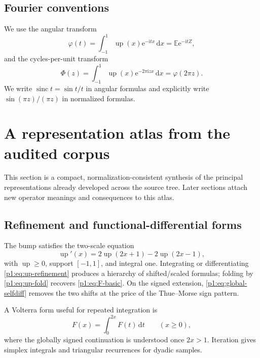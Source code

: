 \documentclass[11pt,oneside]{article}
\theoremstyle{definition}
\newcommand{\dd}{\,\mathrm d}
\newcommand{\e}{\mathrm e}
\newcommand{\ii}{\mathrm i}
\newcommand{\E}{\mathbb E}
\newcommand{\Up}{\operatorname{up}}
\newcommand{\sinc}{\operatorname{sinc}}
\newcommand{\PhiF}{\Phi}
\newcommand{\phiF}{\varphi}
\begin{document}
\subsection{Fourier conventions}

We use the angular transform
\begin{equation}
 \phiF(t)=\int_{-1}^{1}\Up(x)\e^{-\ii tx}\dd x=\E\e^{-\ii tZ},
 \label{p1:eq:angular-transform}
\end{equation}
and the cycles-per-unit transform
\begin{equation}
 \PhiF(z)=\int_{-1}^{1}\Up(x)\e^{-2\pi\ii zx}\dd x=\phiF(2\pi z).
 \label{p1:eq:normalized-transform}
\end{equation}
We write \(\sinc t=\sin t/t\) in angular formulas and explicitly write
\(\sin(\pi z)/(\pi z)\) in normalized formulas.

\section{A representation atlas from the audited corpus}
\label{p1:sec:atlas}

This section is a compact, normalization-consistent synthesis of the principal
representations already developed across the source tree.  Later sections attach new
operator meanings and consequences to this atlas.

\subsection{Refinement and functional-differential forms}

The bump satisfies the two-scale equation
\begin{equation}
 \Up'(x)=2\Up(2x+1)-2\Up(2x-1),
 \label{p1:eq:up-refinement}
\end{equation}
with \(\Up\ge0\), support \([-1,1]\), and integral one.  Integrating or differentiating
\eqref{p1:eq:up-refinement} produces a hierarchy of shifted/scaled formulas; folding by
\eqref{p1:eq:up-fold} recovers \eqref{p1:eq:F-basic}.  On the signed extension,
\eqref{p1:eq:global-selfdiff} removes the two shifts at the price of the Thue--Morse sign
pattern.

A Volterra form useful for repeated integration is
\begin{equation}
 F(x)=\int_0^{2x}F(t)\dd t\qquad(x\ge0),
 \label{p1:eq:volterra-F}
\end{equation}
where the globally signed continuation is understood once \(2x>1\).  Iteration gives
simplex integrals and triangular recurrences for dyadic samples.
\end{document}
